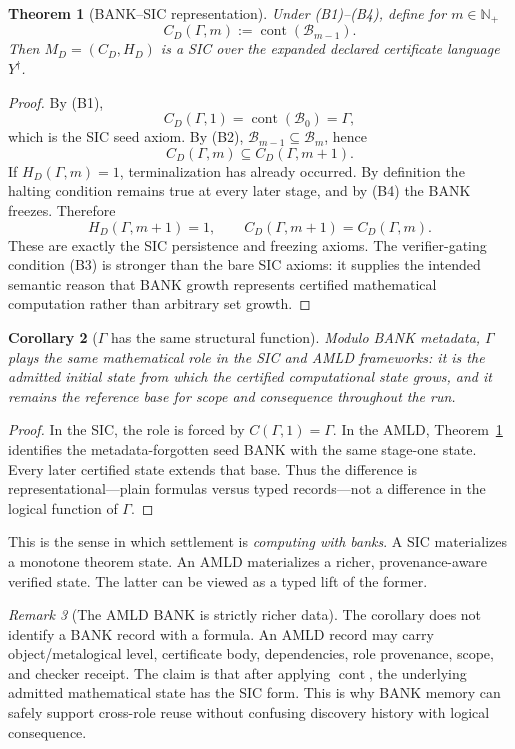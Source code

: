 \documentclass[11pt]{article}
\newtheorem{theorem}{Theorem}[section]
\newtheorem{corollary}[theorem]{Corollary}
\theoremstyle{definition}
\theoremstyle{remark}
\newtheorem{remark}[theorem]{Remark}
\newcommand{\Np}{\mathbb N_{+}}
\newcommand{\Bank}{\mathcal B}
\newcommand{\cont}{\operatorname{cont}}
\begin{document}
\begin{theorem}[BANK--SIC representation]\label{thm:banksic}
Under (B1)--(B4), define for $m\in\Np$
\[
C_D(\Gamma,m):=\cont(\Bank_{m-1}).
\]
Then $M_D=(C_D,H_D)$ is a SIC over the expanded declared certificate language $Y^\dagger$.
\end{theorem}

\begin{proof}
By (B1),
\[
C_D(\Gamma,1)=\cont(\Bank_0)=\Gamma,
\]
which is the SIC seed axiom. By (B2), $\Bank_{m-1}\subseteq\Bank_m$, hence
\[
C_D(\Gamma,m)\subseteq C_D(\Gamma,m+1).
\]
If $H_D(\Gamma,m)=1$, terminalization has already occurred. By definition the halting condition remains true at every later stage, and by (B4) the BANK freezes. Therefore
\[
H_D(\Gamma,m+1)=1,
\qquad
C_D(\Gamma,m+1)=C_D(\Gamma,m).
\]
These are exactly the SIC persistence and freezing axioms. The verifier-gating condition (B3) is stronger than the bare SIC axioms: it supplies the intended semantic reason that BANK growth represents certified mathematical computation rather than arbitrary set growth.
\end{proof}

\begin{corollary}[$\Gamma$ has the same structural function]\label{cor:gamma}
Modulo BANK metadata, $\Gamma$ plays the same mathematical role in the SIC and AMLD frameworks: it is the admitted initial state from which the certified computational state grows, and it remains the reference base for scope and consequence throughout the run.
\end{corollary}

\begin{proof}
In the SIC, the role is forced by $C(\Gamma,1)=\Gamma$. In the AMLD, Theorem~\ref{thm:banksic} identifies the metadata-forgotten seed BANK with the same stage-one state. Every later certified state extends that base. Thus the difference is representational---plain formulas versus typed records---not a difference in the logical function of $\Gamma$.
\end{proof}

This is the sense in which settlement is \emph{computing with banks}. A SIC materializes a monotone theorem state. An AMLD materializes a richer, provenance-aware verified state. The latter can be viewed as a typed lift of the former.

\begin{remark}[The AMLD BANK is strictly richer data]
The corollary does not identify a BANK record with a formula. An AMLD record may carry object/metalogical level, certificate body, dependencies, role provenance, scope, and checker receipt. The claim is that after applying $\cont$, the underlying admitted mathematical state has the SIC form. This is why BANK memory can safely support cross-role reuse without confusing discovery history with logical consequence.
\end{remark}
\end{document}
